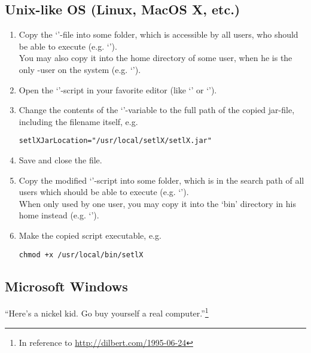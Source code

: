 \subsection{Unix-like OS (Linux, MacOS X, etc.)}\label{Unix}

\begin{enumerate}
	\item Copy the `'-file into some folder, which is accessible by all users, who should be able to execute \setlX{} (e.g. `').\\
	You may also copy it into the home directory of some user, when he is the only \setlX-user on the system (e.g. `').
	\item Open the `'-script in your favorite editor (like `' or `').
	\item Change the contents of the `'-variable to the full path of the copied jar-file, including the filename itself, e.g.
\begin{lstlisting}[frame=none,numbers=none]
setlXJarLocation="/usr/local/setlX/setlX.jar"
\end{lstlisting}
	\item Save and close the file.
	\item Copy the modified `'-script into some folder, which is in the search path of all users which should be able to execute \setlX{} (e.g. `').\\
	When only used by one user, you may copy it into the `bin' directory in his home instead (e.g. `').
	\item Make the copied script executable, e.g.
\begin{lstlisting}[frame=none,numbers=none]
chmod +x /usr/local/bin/setlX
\end{lstlisting}
\end{enumerate}

\subsection{Microsoft Windows}

\begin{center}
\large
``Here's a nickel kid. Go buy yourself a real computer.''\footnote{In reference to \url{http://dilbert.com/1995-06-24}}
\end{center}

